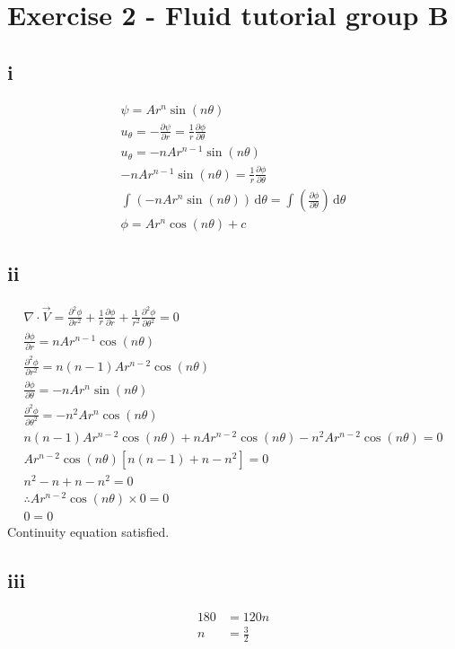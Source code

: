 \documentclass[class=report, crop=false, 12pt,a4paper]{standalone}
\begin{document}
\section*{Exercise 2 - Fluid tutorial group B}
\subsection*{i}
\begin{gather}
  \psi = A r^n \sin(n \theta)\\
  u_\theta = -\frac{\partial \psi }{\partial r}  = \frac{1}{r} \frac{\partial \phi }{\partial \theta } \\
  u_\theta = -nAr^{n-1} \sin(n\theta)\\
  -nAr^{n-1} \sin(n\theta) = \frac{1}{r} \frac{\partial \phi }{\partial \theta }\\
  \int_{}^{} \left( -nAr^{n} \sin(n\theta) \right) \,\mathrm{d}\theta = \int_{}^{} \left( \frac{\partial \phi }{\partial \theta } \right) \,\mathrm{d}\theta \\
  \phi = Ar^n\cos(n\theta) + c 
\end{gather}
\subsection*{ii}
\begin{gather}
  \nabla \cdot \vec{V} = \frac{\partial^2 \phi}{\partial r^2} + \frac{1}{r} \frac{\partial \phi}{\partial r} + \frac{1}{r^2}\frac{\partial^2\phi}{\partial \theta^2} = 0 \\
  \frac{\partial \phi}{\partial r} = nAr^{n-1}\cos(n\theta) \\
  \frac{\partial^2 \phi}{\partial r^2} = n(n-1)Ar^{n-2}\cos(n\theta)\\
  \frac{\partial\phi}{\partial \theta} = -nAr^n\sin(n\theta)\\
  \frac{\partial^2\phi}{\partial \theta^2} = -n^2Ar^n\cos(n\theta)\\
  n(n-1)Ar^{n-2}\cos(n\theta) + nAr^{n-2}\cos(n\theta) -n^2Ar^{n-2}\cos(n\theta) = 0\\
  Ar^{n-2}\cos(n\theta) \left[ n(n-1) + n - n^2 \right] = 0\\
  n^2 - n + n - n^2 = 0 \\
  \therefore Ar^{n-2}\cos(n\theta) \times 0 = 0 \\
  0 = 0 
\end{gather}
Continuity equation satisfied.
\subsection*{iii}
\begin{align}
  180 &= 120n\\
  n &= \frac{3}{2}
\end{align}
\end{document}
